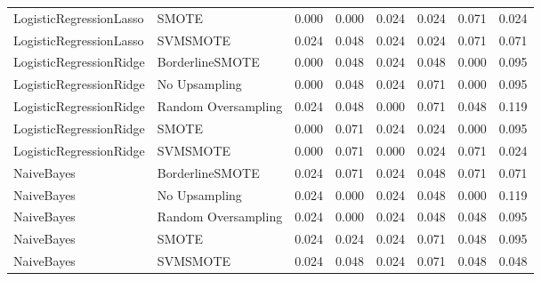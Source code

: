 \begin{tabular}{llllllll}
     LogisticRegressionLasso &               SMOTE & 0.000 &                     0.000 &                 0.024 &                  0.024 &                                   0.071 &     0.024 \\
     LogisticRegressionLasso &            SVMSMOTE & 0.024 &                     0.048 &                 0.024 &                  0.024 &                                   0.071 &     0.071 \\
     LogisticRegressionRidge &     BorderlineSMOTE & 0.000 &                     0.048 &                 0.024 &                  0.048 &                                   0.000 &     0.095 \\
     LogisticRegressionRidge &       No Upsampling & 0.000 &                     0.048 &                 0.024 &                  0.071 &                                   0.000 &     0.095 \\
     LogisticRegressionRidge & Random Oversampling & 0.024 &                     0.048 &                 0.000 &                  0.071 &                                   0.048 &     0.119 \\
     LogisticRegressionRidge &               SMOTE & 0.000 &                     0.071 &                 0.024 &                  0.024 &                                   0.000 &     0.095 \\
     LogisticRegressionRidge &            SVMSMOTE & 0.000 &                     0.071 &                 0.000 &                  0.024 &                                   0.071 &     0.024 \\
                  NaiveBayes &     BorderlineSMOTE & 0.024 &                     0.071 &                 0.024 &                  0.048 &                                   0.071 &     0.071 \\
                  NaiveBayes &       No Upsampling & 0.024 &                     0.000 &                 0.024 &                  0.048 &                                   0.000 &     0.119 \\
                  NaiveBayes & Random Oversampling & 0.024 &                     0.000 &                 0.024 &                  0.048 &                                   0.048 &     0.095 \\
                  NaiveBayes &               SMOTE & 0.024 &                     0.024 &                 0.024 &                  0.071 &                                   0.048 &     0.095 \\
                  NaiveBayes &            SVMSMOTE & 0.024 &                     0.048 &                 0.024 &                  0.071 &                                   0.048 &     0.048 \\

\end{tabular}
